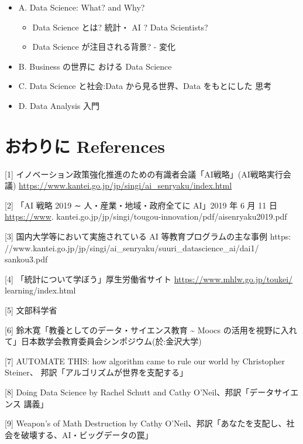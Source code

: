 \documentclass[
]{book}
\providecommand{\tightlist}{%
  \setlength{\itemsep}{0pt}\setlength{\parskip}{0pt}}
\theoremstyle{definition}
\theoremstyle{definition}
\theoremstyle{definition}
\theoremstyle{definition}
\theoremstyle{remark}
\begin{document}
\begin{itemize}
\tightlist
\item
  A. Data Science: What? and Why?

  \begin{itemize}
  \tightlist
  \item
    Data Science とは? 統計・ AI ? Data Scientists?
  \item
    Data Science が注目される背景? - 変化
  \end{itemize}
\item
  B. Business の世界に おける Data Science
\item
  C. Data Science と社会:Data から見る世界、Data をもとにした 思考
\item
  D. Data Analysis 入門
\end{itemize}

\hypertarget{ux304aux308fux308aux306b-references}{%
\section{おわりに References}\label{ux304aux308fux308aux306b-references}}

{[}1{]} イノベーション政策強化推進のための有識者会議「AI戦略」(AI戦略実行会議) \url{https://www.kantei.go.jp/jp/singi/ai_senryaku/index.html}

{[}2{]} 「AI 戦略 2019 ∼ 人・産業・地域・政府全てに AI」2019 年 6 月 11 日 \url{https://www}. kantei.go.jp/jp/singi/tougou-innovation/pdf/aisenryaku2019.pdf

{[}3{]} 国内大学等において実施されている AI 等教育プログラムの主な事例 https: //www.kantei.go.jp/jp/singi/ai\_senryaku/suuri\_datascience\_ai/dai1/ sankou3.pdf

{[}4{]} 「統計について学ぼう」厚生労働省サイト \url{https://www.mhlw.go.jp/toukei/} learning/index.html

{[}5{]} 文部科学省

{[}6{]} 鈴木寛「教養としてのデータ・サイエンス教育 \textasciitilde{} Moocs の活用を視野に入れて」日本数学会教育委員会シンポジウム(於:金沢大学)

{[}7{]} AUTOMATE THIS: how algorithm came to rule our world by Christopher Steiner、 邦訳「アルゴリズムが世界を支配する」

{[}8{]} Doing Data Science by Rachel Schutt and Cathy O'Neil、邦訳「データサイエンス 講義」

{[}9{]} Weapon's of Math Destruction by Cathy O'Neil、邦訳「あなたを支配し、社会を破壊する、AI・ビッグデータの罠」
\end{document}
